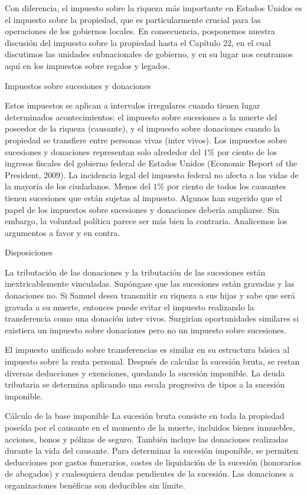 \documentclass[10pt,a4paper]{article}
\begin{document}
Con diferencia, el impuesto sobre la riqueza más importante en Estados Unidos es el impuesto sobre la propiedad, que es particularmente crucial para las operaciones de los gobiernos locales. En consecuencia, posponemos nuestra discusión del impuesto sobre la propiedad hasta el Capítulo 22, en el cual discutimos las unidades subnacionales de gobierno, y en su lugar nos centramos aquí en los impuestos sobre regalos y legados.

Impuestos sobre sucesiones y donaciones

Estos impuestos se aplican a intervalos irregulares cuando tienen lugar determinados acontecimientos: el impuesto sobre sucesiones a la muerte del poseedor de la riqueza (causante), y el impuesto sobre donaciones cuando la propiedad se transfiere entre personas vivas (inter vivos). Los impuestos sobre sucesiones y donaciones representan solo alrededor del $1\%$ por ciento de los ingresos fiscales del gobierno federal de Estados Unidos (Economic Report of the President, 2009). La incidencia legal del impuesto federal no afecta a las vidas de la mayoría de los ciudadanos. Menos del $1\%$ por ciento de todos los causantes tienen sucesiones que están sujetas al impuesto. Algunos han sugerido que el papel de los impuestos sobre sucesiones y donaciones debería ampliarse. Sin embargo, la voluntad política parece ser más bien la contraria. Analicemos los argumentos a favor y en contra.



Disposiciones

La tributación de las donaciones y la tributación de las sucesiones están inextricablemente vinculadas. Supóngase que las sucesiones están gravadas y las donaciones no. Si Samuel desea transmitir su riqueza a sus hijas y sabe que será gravada a su muerte, entonces puede evitar el impuesto realizando la transferencia como una donación inter vivos. Surgirían oportunidades similares si existiera un impuesto sobre donaciones pero no un impuesto sobre sucesiones. 

El impuesto unificado sobre transferencias es similar en su estructura básica al impuesto sobre la renta personal. Después de calcular la sucesión bruta, se restan diversas deducciones y exenciones, quedando la sucesión imponible. La deuda tributaria se determina aplicando una escala progresiva de tipos a la sucesión imponible.

Cálculo de la base imponible 
La sucesión bruta consiste en toda la propiedad poseída por el causante en el momento de la muerte, incluidos bienes inmuebles, acciones, bonos y pólizas de seguro. También incluye las donaciones realizadas durante la vida del causante. Para determinar la sucesión imponible, se permiten deducciones por gastos funerarios, costes de liquidación de la sucesión (honorarios de abogados) y cualesquiera deudas pendientes de la sucesión. Las donaciones a organizaciones benéficas son deducibles sin límite.
\end{document}
